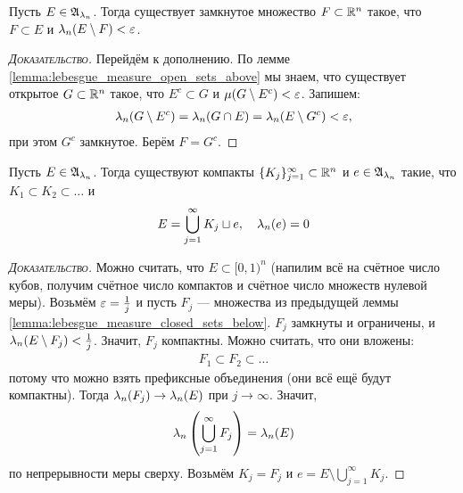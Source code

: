 
\newcommand{\lan}{\ensuremath \lambda_n}
\newcommand{\alan}{\ensuremath \A_{\lan}}

\begin{lm}
 \label{lemma:lebesgue_measure_closed_sets_below}
 Пусть $E \in \mathfrak{A}_{\lambda_n}$. Тогда существует замкнутое множество $F \subset \mathbb{R}^{n}$ такое, что $F \subset E$ и $\lambda_n(E \setminus F) < \varepsilon$.
\end{lm}
\begin{proof}[\normalfont\textsc{Доказательство}]
 Перейдём к дополнению. По лемме \ref{lemma:lebesgue_measure_open_sets_above} мы знаем, что существует открытое $G \subset \mathbb{R}^{n}$ такое, что $E^{c} \subset G$ и $\mu(G \setminus E^{c}) < \varepsilon$. Запишем: \begin{align*}
  \lambda_n(G \setminus E^{c}) = \lambda_n(G \cap E) = \lambda_n(E \setminus G^{c}) < \varepsilon
 ,\end{align*} при этом $G^{c}$ замкнутое. Берём $F = G^{c}$.
\end{proof}
\begin{lm}
 \label{lemma:lebesgue_measure_compact_union}
 Пусть $E \in \mathfrak{A}_{\lambda_n}$. Тогда существуют компакты $\{K_{j}\}_{j=1}^{\infty} \subset \mathbb{R}^{n}$ и  $e \in \mathfrak{A}_{\lambda_n}$ такие, что $K_1 \subset K_2 \subset \ldots$ и \begin{align*}
  E = \bigcup_{j=1}^{\infty} K_j \sqcup e, \quad \lan(e) = 0
 \end{align*} 
\end{lm}
\begin{proof}[\normalfont\textsc{Доказательство}]
 Можно считать, что $E \subset [0, 1)^{n}$ (напилим всё на счётное число кубов, получим счётное число компактов и счётное число множеств нулевой меры). Возьмём $\varepsilon = \frac{1}{j}$ и пусть $F_j$ --- множества из предыдущей леммы \ref{lemma:lebesgue_measure_closed_sets_below}. $F_j$ замкнуты и ограничены, и $\lan(E \setminus F_j) < \frac{1}{j}$. Значит, $F_j$ компактны. Можно считать, что они вложены: \begin{align*}
  F_1 \subset F_2 \subset \ldots
 \end{align*} потому что можно взять префиксные объединения (они всё ещё будут компактны). Тогда $ \lan(F_j) \to \lan(E) $ при $j \to \infty$. Значит, \begin{align*}
  \lan \left( \bigcup_{j=1}^{\infty} F_j \right) = \lan(E)
 \end{align*} по непрерывности меры сверху. Возьмём $K_j = F_j$  и $e = E \setminus \bigcup_{j=1}^{\infty} K_j $.
\end{proof}
